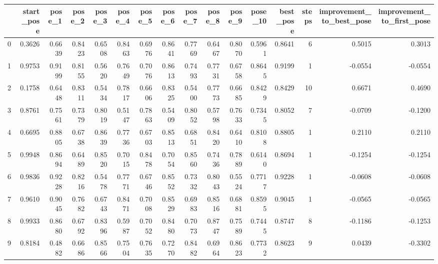 \begin{tabular}{lrrrrrrrrrrrrrrr}
\toprule
{} &  start\_pose &  pose\_1 &  pose\_2 &  pose\_3 &  pose\_4 &  pose\_5 &  pose\_6 &  pose\_7 &  pose\_8 &  pose\_9 &  pose\_10 &  best\_pose &  steps &  improvement\_to\_best\_pose &  improvement\_to\_first\_pose \\
\midrule
0   &      0.3626 &  0.6639 &  0.8423 &  0.6508 &  0.8463 &  0.6976 &  0.8641 &  0.7769 &  0.6467 &  0.8070 &   0.5961 &     0.8641 &      6 &                    0.5015 &                     0.3013 \\
1   &      0.9753 &  0.9199 &  0.8155 &  0.5620 &  0.7649 &  0.7076 &  0.8613 &  0.7493 &  0.7731 &  0.6758 &   0.8645 &     0.9199 &      1 &                   -0.0554 &                    -0.0554 \\
2   &      0.1758 &  0.6448 &  0.8311 &  0.5434 &  0.7817 &  0.6606 &  0.8325 &  0.5400 &  0.7773 &  0.6685 &   0.8429 &     0.8429 &     10 &                    0.6671 &                     0.4690 \\
3   &      0.8761 &  0.7561 &  0.7379 &  0.8019 &  0.5147 &  0.7863 &  0.5409 &  0.8052 &  0.5798 &  0.7633 &   0.7345 &     0.8052 &      7 &                   -0.0709 &                    -0.1200 \\
4   &      0.6695 &  0.8805 &  0.6738 &  0.8639 &  0.7736 &  0.6703 &  0.8513 &  0.6851 &  0.8420 &  0.6410 &   0.8108 &     0.8805 &      1 &                    0.2110 &                     0.2110 \\
5   &      0.9948 &  0.8694 &  0.6489 &  0.8520 &  0.7015 &  0.8478 &  0.7054 &  0.8560 &  0.7436 &  0.7889 &   0.6140 &     0.8694 &      1 &                   -0.1254 &                    -0.1254 \\
6   &      0.9836 &  0.9228 &  0.8216 &  0.5478 &  0.7771 &  0.6746 &  0.8552 &  0.7332 &  0.8043 &  0.5524 &   0.7717 &     0.9228 &      1 &                   -0.0608 &                    -0.0608 \\
7   &      0.9610 &  0.9045 &  0.7682 &  0.6743 &  0.8471 &  0.7008 &  0.8529 &  0.6983 &  0.8516 &  0.6881 &   0.8595 &     0.9045 &      1 &                   -0.0565 &                    -0.0565 \\
8   &      0.9933 &  0.8680 &  0.6792 &  0.8396 &  0.5987 &  0.7052 &  0.8480 &  0.7073 &  0.8747 &  0.7589 &   0.7445 &     0.8747 &      8 &                   -0.1186 &                    -0.1253 \\
9   &      0.8184 &  0.4882 &  0.6686 &  0.8566 &  0.7504 &  0.7635 &  0.7270 &  0.8482 &  0.6964 &  0.8623 &   0.7732 &     0.8623 &      9 &                    0.0439 &                    -0.3302 \\

\end{tabular}
